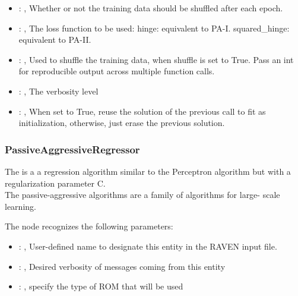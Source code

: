 \begin{itemize}
    \item {}: , 
      Whether or not the training data should be shuffled after each epoch.

    \item {}: , 
      The loss function to be used: hinge: equivalent to PA-I.
      squared\_hinge: equivalent to PA-II.

    \item {}: , 
      Used to shuffle the training data, when shuffle is set to
      True. Pass an int for reproducible output across multiple function calls.

    \item {}: , 
      The verbosity level

    \item {}: , 
      When set to True, reuse the solution of the previous call
      to fit as initialization, otherwise, just erase the previous solution.
  \end{itemize}


\subsubsection{PassiveAggressiveRegressor}
  The                          is a a regression algorithm
  similar to the Perceptron algorithm                         but with a regularization parameter C.
  \\The passive-aggressive algorithms are a family of algorithms for                         large-
  scale learning.                         

  The  node recognizes the following parameters:
    \begin{itemize}
      \item {}: , 
        User-defined name to designate this entity in the RAVEN input file.
      \item {}: , 
        Desired verbosity of messages coming from this entity
      \item {}: , 
        specify the type of ROM that will be used
  \end{itemize}

